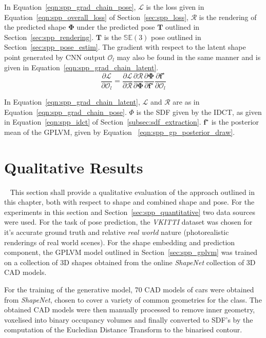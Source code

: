 In Equation~\ref{eqn:spp_grad_chain_pose}, \( \mathcal{L} \) is the loss given in Equation~\ref{eqn:spp_overall_loss}
of Section~\ref{sec:spp_loss}, \( \mathcal{R} \) is the rendering of the predicted shape \( \bm{\Phi} \) under the 
predicted pose \( \bm{T} \) outlined in Section~\ref{sec:spp_rendering}. \( \bm{T} \) is the 
\( \mathbb{SE}(3) \) pose outlined in Section~\ref{sec:spp_pose_estim}. The gradient with respect 
to the latent shape point generated by CNN output \( \mathcal{O}_{l} \) may also be found in the same 
manner and is given in Equation~\ref{eqn:spp_grad_chain_latent}.
\begin{equation}
  \label{eqn:spp_grad_chain_latent}
  \frac{\partial \mathcal{L}}{\partial \mathcal{O}_{l}} = 
    \frac{\partial \mathcal{L}}{\partial \mathcal{R}}
    \frac{\partial \mathcal{R}}{\partial \mathcal{\bm{\Phi}}}
    \frac{\partial \bm{\Phi}}{\partial \bm{f}^{\star}}
    \frac{\partial \bm{f}^{\star}}{\partial \mathcal{O}_{l}}
\end{equation}

In Equation~\ref{eqn:spp_grad_chain_latent}, \( \mathcal{L} \) and \( \mathcal{R} \) 
are as in Equation~\ref{eqn:spp_grad_chain_pose}. \( \Phi \) is the SDF given by the IDCT, 
as given in Equation~\ref{eqn:spp_idct} of Section~\ref{subsec:sdf_extraction}. 
\( \bm{f}^{\star} \) is the posterior mean of the GPLVM, given by Equation
~\ref{eqn:spp_gp_posterior_draw}.

\section{Qualitative Results}
~\label{sec:spp_qualitative}
This section shall provide a qualitative evaluation of the approach outlined in this chapter, both with respect to shape 
and combined shape and pose. For the experiments in this section and Section~\ref{sec:spp_quantitative} two data sources were 
used. For the task of pose prediction, the \textit{VKITTI} dataset was chosen for it's accurate ground truth and relative 
\textit{real world} nature (photorealistic renderings of real world scenes). For the shape embedding and prediction component, 
the GPLVM model outlined in Section~\ref{sec:spp_gplvm} was trained on a collection of 3D shapes obtained from the online 
\textit{ShapeNet} collection of 3D CAD models\footnotemark. 
~

For the training of the generative model, 70 CAD models of cars were obtained from \textit{ShapeNet}, chosen to cover a variety 
of common geometries for the class. The obtained CAD models were then manually processed to remove inner geometry, voxelised into 
binary occupancy volumes and finally converted to SDF's by the computation of the Eucledian Distance Transform to the binarised 
contour. 

